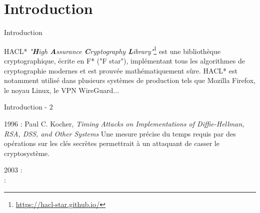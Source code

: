 \documentclass{backend/backend}
\begin{document}
\justifying

\begin{frame}
    \titlepage
\end{frame}

\comment{  %
} %


%
%
\showtoctrue %
\section{Introduction}

\begin{frame}{Introduction}
    \begin{exampleblock}{HACL*}
        \textit{"\textbf{H}igh \textbf{A}ssurance \textbf{C}ryptography \textbf{L}ibrary"}\cite{HACL*}\footnote{\url{https://hacl-star.github.io/}} est une bibliothèque cryptographique, écrite en F* ("F star"), implémentant tous les algorithmes de cryptographie modernes et est prouvée mathématiquement sûre. 
        \smallbreak
        HACL* est notamment utilisé dans plusieurs systèmes de production tels que Mozilla Firefox, le noyau Linux, le VPN WireGuard...
    \end{exampleblock}
\end{frame}

\begin{frame}{Introduction - 2}
    \begin{block}{1996 : Paul C. Kocher, \textit{Timing Attacks on Implementations of Diffie-Hellman, RSA, DSS, and Other Systems} }
        Une mesure précise du temps requis par des opérations sur les clés secrètes permettrait à un attaquant de casser le cryptosystème.
    \end{block}
    2003 : \citeauthor{270176} \\
     : \citeauthor{stillPractical} 
\end{frame}
\end{document}
